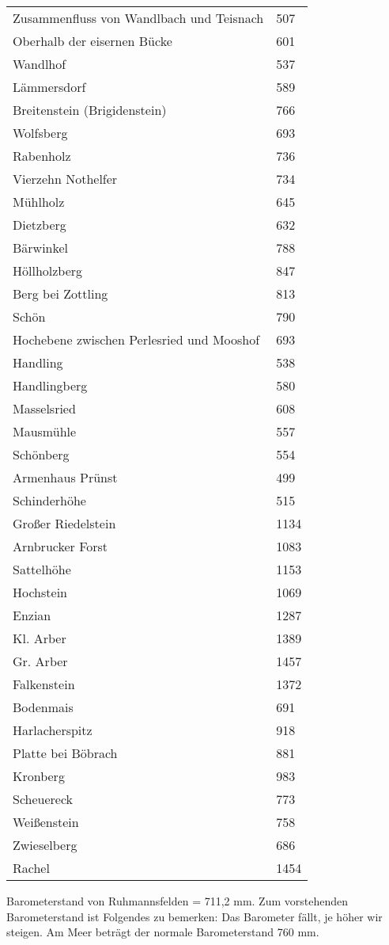 \documentclass[12pt,a4paper]{book}
\begin{document}
\begin{longtable}{ll}
Zusammenfluss von Wandlbach und Teisnach & 507 \\
Oberhalb der eisernen Bücke & 601 \\
Wandlhof & 537 \\
Lämmersdorf & 589 \\
Breitenstein (Brigidenstein) & 766 \\
Wolfsberg & 693 \\
Rabenholz & 736 \\
Vierzehn Nothelfer & 734 \\
Mühlholz & 645 \\
Dietzberg & 632 \\
Bärwinkel & 788 \\
Höllholzberg & 847 \\
Berg bei Zottling & 813 \\
Schön & 790 \\
Hochebene zwischen Perlesried und Mooshof & 693 \\
Handling & 538 \\
Handlingberg & 580 \\
Masselsried & 608 \\
Mausmühle & 557 \\
Schönberg & 554 \\
Armenhaus Prünst & 499 \\
Schinderhöhe & 515 \\
Großer Riedelstein & 1134 \\
Arnbrucker Forst & 1083 \\
Sattelhöhe & 1153 \\
Hochstein & 1069 \\
Enzian & 1287 \\
Kl. Arber & 1389 \\
Gr. Arber & 1457 \\
Falkenstein & 1372 \\
Bodenmais & 691 \\
Harlacherspitz & 918 \\
Platte bei Böbrach & 881 \\
Kronberg & 983 \\
Scheuereck & 773 \\
Weißenstein & 758 \\
Zwieselberg & 686 \\
Rachel & 1454 \\
\end{longtable}

Barometerstand von Ruhmannsfelden = 711,2 mm. Zum vorstehenden
Barometerstand ist Folgendes zu bemerken: Das Barometer fällt, je höher
wir steigen. Am Meer beträgt der normale Barometerstand 760 mm.
\end{document}
